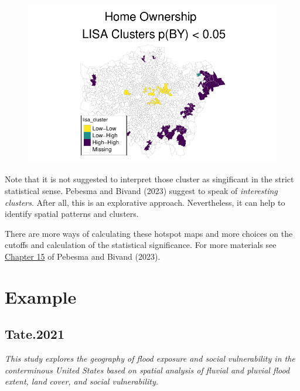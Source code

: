 \documentclass[
  letterpaper,
]{scrbook}
\begin{document}
\begin{figure}[H]

{\centering \includegraphics{04_dependence_files/figure-pdf/unnamed-chunk-19-1.pdf}

}

\end{figure}

Note that it is not suggested to interpret those cluster as singificant
in the strict statistical sense. Pebesma and Bivand (2023) suggest to
speak of \emph{interesting clusters}. After all, this is an explorative
approach. Nevertheless, it can help to identify spatial patterns and
clusters.

There are more ways of calculating these hotspot maps and more choices
on the cutoffs and calculation of the statistical significance. For more
materials see \href{https://r-spatial.org/book/15-Measures.html}{Chapter
15} of Pebesma and Bivand (2023).

\hypertarget{example-1}{%
\section{Example}\label{example-1}}

\hypertarget{tate.2021}{%
\subsection*{Tate.2021}\label{tate.2021}}

\emph{This study explores the geography of flood exposure and social
vulnerability in the conterminous United States based on spatial
analysis of fluvial and pluvial flood extent, land cover, and social
vulnerability.}
\end{document}
